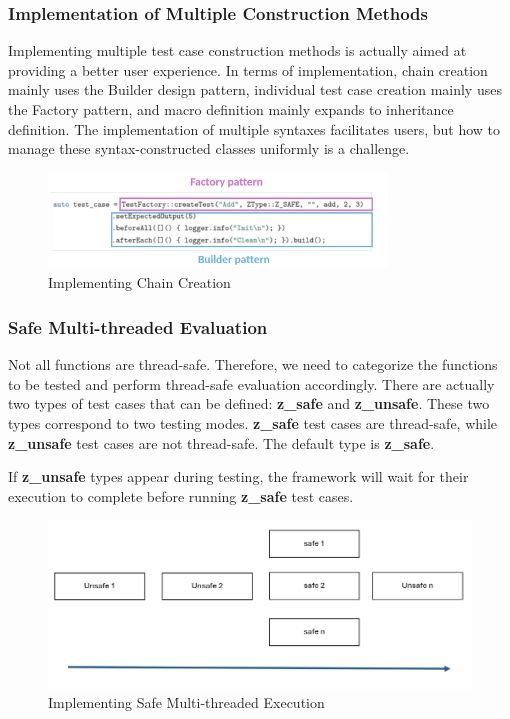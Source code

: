 \documentclass[english]{article}
\begin{document}
\subsubsection{Implementation of Multiple Construction Methods}
Implementing multiple test case construction methods is actually aimed at providing a better user experience. In terms of implementation, chain creation mainly uses the Builder design pattern, individual test case creation mainly uses the Factory pattern, and macro definition mainly expands to inheritance definition. The implementation of multiple syntaxes facilitates users, but how to manage these syntax-constructed classes uniformly is a challenge.
\begin{figure}[H]
    \centering
    \includegraphics[width=0.8\textwidth]{img/build.png} %
    \caption{ Implementing Chain Creation}
    \label{fig:diagram}
\end{figure}
\subsubsection{Safe Multi-threaded Evaluation}
Not all functions are thread-safe. Therefore, we need to categorize the functions to be tested and perform thread-safe evaluation accordingly. There are actually two types of test cases that can be defined: \textbf{z\_safe} and \textbf{z\_unsafe}. These two types correspond to two testing modes. \textbf{z\_safe} test cases are thread-safe, while \textbf{z\_unsafe} test cases are not thread-safe. The default type is \textbf{z\_safe}.

If \textbf{z\_unsafe} types appear during testing, the framework will wait for their execution to complete before running \textbf{z\_safe} test cases.
\begin{figure}[H]
    \centering
    \includegraphics[width=\textwidth]{img/run.png} %
    \caption{ Implementing Safe Multi-threaded Execution}
    \label{fig:diagram}
\end{figure}
\end{document}
